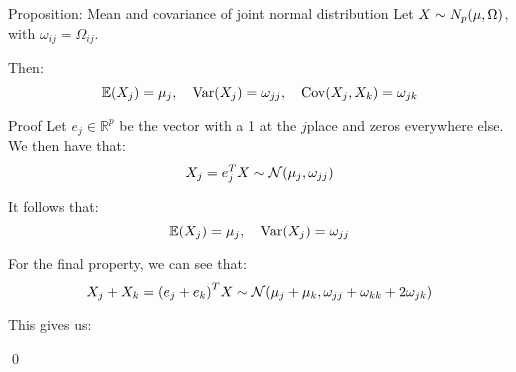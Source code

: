 \documentclass[a4paper]{article}
\begin{document}
\begin{parag}{Proposition: Mean and covariance of joint normal distribution}
    Let $X \followsdistr N_p\left(\mu, \Omega\right)$, with $\omega_{ij} = \Omega_{ij}$. 

    Then: 
    \[\exval\left(X_j\right) = \mu_j, \mathspace \Var\left(X_j\right) = \omega_{jj}, \mathspace \Cov\left(X_j, X_k\right) = \omega_{jk}\]
    
    \begin{subparag}{Proof}
        Let $e_j \in \mathbb{R}^p$ be the vector with a 1 at the $j$\Th place and zeros everywhere else. We then have that: 
        \[X_j = e_j^T X \followsdistr \mathcal{N}\left(\mu_j, \omega_{jj}\right)\]
        
        It follows that: 
        \[\exval\left(X_j\right) = \mu_j, \mathspace \Var\left(X_j\right) = \omega_{jj}\]

        For the final property, we can see that: 
        \[X_j + X_k = \left(e_j + e_k\right)^T X \followsdistr \mathcal{N}\left(\mu_j + \mu_k, \omega_{jj} + \omega_{kk} + 2 \omega_{jk}\right)\]
        
        This gives us: 

        \qed
    \end{subparag}
\end{parag}
\end{document}
